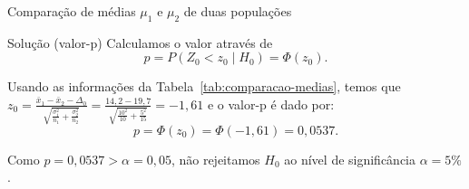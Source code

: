 \documentclass[9pt]{beamer}
\begin{document}
\begin{frame}{Comparação de médias $\mu_1$ e $\mu_2$ de duas populações}
\begin{block}{Solução (valor-p)}
	Calculamos o valor através de 
	$$p=P\left( Z_0 < z_0 \mid H_0 \right) = \Phi\left( z_0 \right).$$
	
	Usando as informações da Tabela~\ref{tab:comparacao-medias}, temos que $z_0 = \frac{\bar{x}_1 - \bar{x}_2 - \Delta_0}{\sqrt{ \frac{\sigma_1^2}{n_1} + \frac{\sigma_2^2}{n_2} }} = \frac{ 14,2 - 19,7 }{ \sqrt{ \frac{10^2}{10} + \frac{5^2}{15} } } = -1,61$ e o valor-p é dado por:
	$$p = \Phi \left( z_0 \right) =  \Phi\left(-1,61\right) = 0,0537.$$
	
	Como $p=0,0537 > \alpha = 0,05$, não rejeitamos $H_0$ ao nível de significância $\alpha=5\%$.
\end{block}
\end{frame}
\end{document}

